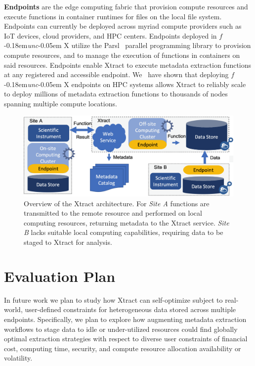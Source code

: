 \documentclass[sigconf, 9pt]{acmart}
\newcommand{\name}{Xtract}
\newcommand{\funcx}{$f$\kern-0.18em\emph{unc}\kern-0.05em X}
\begin{document}
\textbf{Endpoints} are the edge computing fabric that provision compute resources and execute functions in container runtimes for files on the local file system.
 Endpoints can currently be deployed across myriad compute providers such as IoT devices, cloud providers, and HPC centers.  
Endpoints deployed in \funcx{} utilize the Parsl~\cite{babuji2019parsl} parallel programming library to 
provision compute resources, and to manage the execution of functions in containers on said resources. Endpoints enable 
\name{} to execute metadata extraction functions at any registered and accessible endpoint. We~\cite{chard2019serverless} have shown that deploying \funcx{} 
endpoints on HPC systems allows \name{} to reliably
scale to deploy millions of metadata extraction functions to thousands of nodes spanning multiple compute locations. 


\begin{figure}[t]
	\centering
	\includegraphics[scale=0.17]{figs/updated-fig.png}
	\caption{Overview of the \name{} architecture. For \textit{Site A} functions are transmitted to the remote resource and performed on local computing resources, returning metadata to the \name{} service. \textit{Site B} lacks suitable local
	computing capabilities, requiring data to be staged to \name{} for analysis.}
	\label{fig:arch}
\end{figure}


\section{Evaluation Plan}
\label{sec:eval}

In future work we plan to study how \name{} can self-optimize subject to real-world, user-defined constraints for heterogeneous data stored across multiple 
endpoints.  Specifically, we plan to explore how augmenting metadata extraction workflows to stage data to idle or under-utilized resources could 
find globally optimal extraction strategies with respect to diverse user constraints of financial cost, computing time, security, and compute resource allocation 
availability or volatility.
\end{document}
